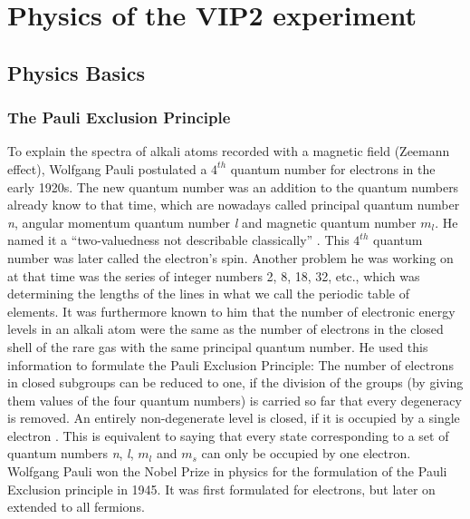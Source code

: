\chapter{Physics of the VIP2 experiment}
\label{chap:Physics}


\section{Physics Basics}
\label{sec:PhysicsBasics}

\subsection{The Pauli Exclusion Principle}
\label{sec:pep}

To explain the spectra of alkali atoms recorded with a magnetic field (Zeemann effect), Wolfgang Pauli postulated a $4^{th}$ quantum number for electrons in the early 1920s. The new quantum number was an addition to the quantum numbers already know to that time, which are nowadays called principal quantum number \textit{n}, angular momentum quantum number \textit{l} and magnetic quantum number \textit{$m_{l}$}. He named it a ``two-valuedness not describable classically'' \cite{Pauli1946}. This $4^{th}$ quantum number was later called the electron's spin. Another problem he was working on at that time was the series of integer numbers 2, 8, 18, 32, etc., which was determining the lengths of the lines in what we call the periodic table of elements. It was furthermore known to him that the number of electronic energy levels in an alkali atom were the same as the number of electrons in the closed shell of the rare gas with the same principal quantum number. He used this information to formulate the Pauli Exclusion Principle: The number of electrons in closed subgroups can be reduced to one, if the division of the groups (by giving them values of the four quantum numbers) is carried so far that every degeneracy is removed. An entirely non-degenerate level is closed, if it is occupied by a single electron \cite{Pauli1946}. This is equivalent to saying that every state corresponding to a set of quantum numbers \textit{n}, \textit{l}, \textit{$m_{l}$} and \textit{$m_{s}$} can only be occupied by one electron. Wolfgang Pauli won the Nobel Prize in physics for the formulation of the Pauli Exclusion principle in 1945. It was first formulated for electrons, but later on extended to all fermions.

